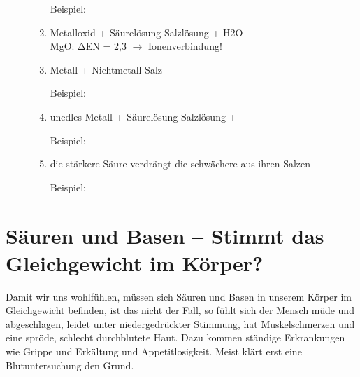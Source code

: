 \begin{description}
\begin{enumerate}
\begin{description}
                     \item[Beispiel:] 
                  \end{description}
                  \item Metalloxid + Säurelösung \ce{->} Salzlösung + \acl{H2O} \\
                  \acs{MgO}: $\mathrm{\Delta}$EN = 2,3 $\rightarrow$ Ionenverbindung! \\
                  \item Metall + Nichtmetall \ce{->} Salz
                  \begin{description}
                     \item[Beispiel:] 
                  \end{description}
                  \item unedles Metall + Säurelösung \ce{->} Salzlösung + 
                  \begin{description}
                     \item[Beispiel:]  \ifDraftQ{}
                  \end{description}
                  \item die stärkere Säure verdrängt die schwächere aus ihren Salzen
                  \begin{description}
                     \item[Beispiel:] 
                  \end{description}
                 \end{enumerate}
\end{description}

\section{Säuren und Basen -- Stimmt das Gleichgewicht im Körper?}
Damit wir uns wohlfühlen, müssen sich Säuren und Basen in
 unserem Körper im Gleichgewicht befinden, ist das nicht der
 Fall, so fühlt sich der Mensch müde und abgeschlagen, leidet
 unter niedergedrückter Stimmung, hat Muskelschmerzen
 und eine spröde, schlecht durchblutete Haut. Dazu kommen
 ständige Erkrankungen wie Grippe und Erkältung und Appetitlosigkeit.
 Meist klärt erst eine Blutuntersuchung den Grund.


